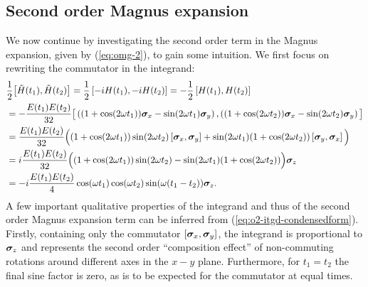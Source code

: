 \subsection{Second order Magnus expansion}
We now continue by investigating the second order term in the Magnus expansion, given by (\ref{eq:omg-2}), to gain some intuition. We first focus on rewriting the commutator in the integrand:
\begin{alignat}{1}
	&\frac{1}{2}\big[ \tilde{H}(t_1), \tilde{H}(t_2) \big] = \frac{1}{2}\left[ -iH(t_1), -iH(t_2) \right] = - \frac{1}{2}\left[ H(t_1), H(t_2) \right] \nonumber \\
	&= -\frac{E(t_1)E(t_2)}{32} \big[ \left( (1 + \cos(2 \omega t_1)) \bm{\sigma}_x - \sin(2 \omega t_1) \bm{\sigma}_y \right), \left( (1 + \cos(2 \omega t_2)) \bm{\sigma}_x - \sin(2 \omega t_2) \bm{\sigma}_y \right) \big] \nonumber \\
	&= \frac{E(t_1)E(t_2)}{32} \Big( (1 + \cos(2 \omega t_1))\sin(2 \omega t_2) \left[  \bm{\sigma}_x, \bm{\sigma}_y \right] + \sin(2 \omega t_1) (1 + \cos(2 \omega t_2)) \left[\bm{\sigma}_y,\bm{\sigma}_x\right] \Big) \nonumber \\
	&= i \frac{E(t_1)E(t_2)}{32} \Big( (1 + \cos(2 \omega t_1))\sin(2 \omega t_2) - \sin(2 \omega t_1) (1 + \cos(2 \omega t_2)) \Big) \bm{\sigma}_z \label{eq:o2-itgd-expandedform} \\
	&= -i\frac{E(t_1)E(t_2)}{4} \cos(\omega t_1) \cos(\omega t_2) \sin(\omega(t_1 - t_2)) \bm{\sigma}_z \label{eq:o2-itgd-condensedform}.
\end{alignat}
A few important qualitative properties of the integrand and thus of the second order Magnus expansion term can be inferred from (\ref{eq:o2-itgd-condensedform}). Firstly, containing only the commutator $[\bm{\sigma}_x,\bm{\sigma}_y]$, the integrand is proportional to $\bm{\sigma}_z$ and represents the second order ``composition effect'' of non-commuting rotations around different axes in the $x-y$ plane. Furthermore, for $t_1 = t_2$ the final sine factor is zero, as is to be expected for the commutator at equal times.

